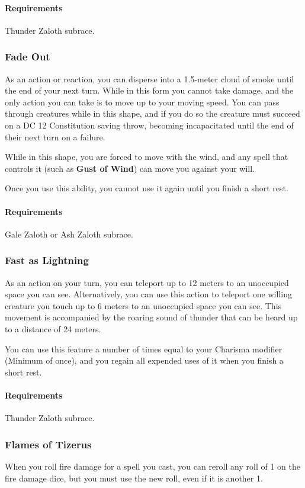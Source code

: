         \paragraph{Requirements} Thunder Zaloth subrace.
    \subsubsection{Fade Out} \label{feat::fadeout}
        As an action or reaction, you can disperse into a 1.5-meter cloud of smoke until the end of your next turn.
        While in this form you cannot take damage, and the only action you can take is to move up to your moving speed.
        You can pass through creatures while in this shape, and if you do so the creature must succeed on a DC 12 Constitution saving throw, becoming incapacitated until the end of their next turn on a failure.

        While in this shape, you are forced to move with the wind, and any spell that controls it (such as \textbf{Gust of Wind}) can move you against your will.

        Once you use this ability, you cannot use it again until you finish a short rest.
        \paragraph{Requirements} Gale Zaloth or Ash Zaloth subrace.
    \subsubsection{Fast as Lightning} \label{feat::fastaslightning}
        As an action on your turn, you can teleport up to 12 meters to an unoccupied space you can see.
        Alternatively, you can use this action to teleport one willing creature you touch up to 6 meters to an unoccupied space you can see.
        This movement is accompanied by the roaring sound of thunder that can be heard up to a distance of 24 meters.

        You can use this feature a number of times equal to your Charisma modifier (Minimum of once), and you regain all expended uses of it when you finish a short rest.
        \paragraph{Requirements} Thunder Zaloth subrace.
    \subsubsection{Flames of Tizerus} \label{feat::flamesoftizerus}
        When you roll fire damage for a spell you cast, you can reroll any roll of 1 on the fire damage dice, but you must use the new roll, even if it is another 1.

